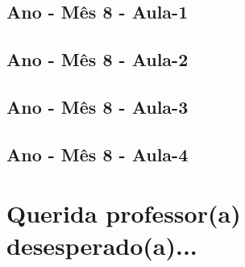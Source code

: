\begin{multicols}{2}
\section[\sffamily 5\textordmasculine\space Ano - M\^{e}s 8 - Aula-1]{\textordmasculine\space Ano - M\^{e}s 8 - Aula-1}


\section[\sffamily 5\textordmasculine\space Ano - M\^{e}s 8 - Aula-2]{\textordmasculine\space Ano - M\^{e}s 8 - Aula-2}


\section[\sffamily 5\textordmasculine\space Ano - M\^{e}s 8 - Aula-3]{\textordmasculine\space Ano - M\^{e}s 8 - Aula-3}


\section[\sffamily 5\textordmasculine\space Ano - M\^{e}s 8 - Aula-4]{\textordmasculine\space Ano - M\^{e}s 8 - Aula-4}


\end{multicols}


\chapter[ Querido(a) professor(a) desesperado(a)...]{Querida professor(a) desesperado(a)...}


